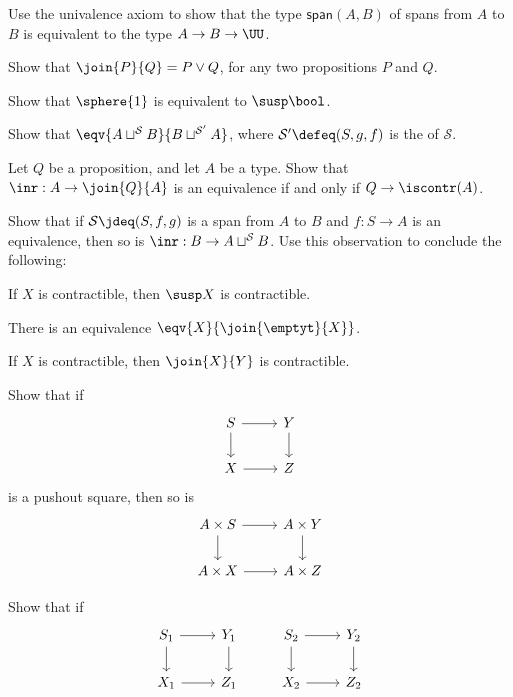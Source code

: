 \begin{exercises}
\item Use the univalence axiom to show that the type $\mathsf{span}(A,B)$ of spans from $A$ to $B$ is equivalent to the type $A\to B\to\UU$.
\item Show that $\join{P}{Q}= P\lor Q$, for any two propositions $P$ and $Q$.
\item Show that $\sphere{1}$ is equivalent to $\susp\bool$. 
\item Show that $\eqv{A\sqcup^{\mathcal{S}} B}{B\sqcup^{\mathcal{S}'} A}$, where $\mathcal{S'}\defeq (S,g,f)$ is the  of $\mathcal{S}$. 
\item Let $Q$ be a proposition, and let $A$ be a type. Show that $\inr:A\to \join{Q}{A}$ is an equivalence if and only if $Q\to\iscontr(A)$.
\item Show that if $\mathcal{S}\jdeq(S,f,g)$ is a span from $A$ to $B$ and $f:S\to A$ is an equivalence, then so is $\inr:B\to A\sqcup^\mathcal{S} B$. Use this observation to conclude the following:
\begin{subexenum}
\item If $X$ is contractible, then $\susp X$ is contractible.
\item There is an equivalence $\eqv{X}{\join{\emptyt}{X}}$.
\item If $X$ is contractible, then $\join{X}{Y}$ is contractible. 
\end{subexenum}
\item Show that if
\begin{equation*}
\begin{tikzcd}
S \arrow[r] \arrow[d] & Y \arrow[d] \\
X \arrow[r] & Z
\end{tikzcd}
\end{equation*}
is a pushout square, then so is
\begin{equation*}
\begin{tikzcd}
A\times S \arrow[r] \arrow[d] & A\times Y \arrow[d] \\
A\times X \arrow[r] & A\times Z
\end{tikzcd}
\end{equation*}
\item Show that if
\begin{equation*}
\begin{tikzcd}
S_1 \arrow[r] \arrow[d] & Y_1 \arrow[d] & S_2 \arrow[r] \arrow[d] & Y_2 \arrow[d] \\
X_1 \arrow[r] & Z_1 & X_2 \arrow[r] & Z_2
\end{tikzcd}

\end{equation*}
\end{exercises}

